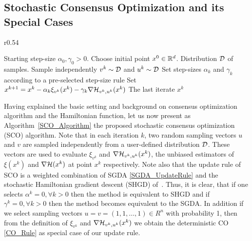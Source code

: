 \documentclass{article}
\begin{document}
\subsection{Stochastic Consensus Optimization and its Special Cases}
\begin{wrapfigure}{r}{0.54\textwidth}
\begin{minipage}{0.54\textwidth}
\vspace{-5ex}
\begin{algorithm}[H]%
   \caption{Stochastic Consensus Opt. (SCO)}
   \label{SCO_Algorithm}
\begin{algorithmic}
    Starting step-size $\alpha_0, \gamma_0>0$. Choose initial point $x^0 \in \mathbb{R}^d$. Distribution ${\cal D}$ of samples.\hspace{-10mm}   
   \STATE Sample independently $v^k \sim {\cal D}$ and $u^k \sim {\cal D}$
   \STATE Set step-sizes $\alpha_k$ and $\gamma_k$ according to a pre-selected step-size rule
   \STATE Set  $x^{k+1}=x^k - \alpha_k \xi_{v^k}(x^k) - \gamma_k \nabla {\cal H}_{v^k,u^k}(x^k)$
   \ENDFOR
    The last iterate $x^k$
\end{algorithmic}
\end{algorithm}
\end{minipage}
\vspace{-2ex}
\end{wrapfigure}
Having explained the basic setting and background on consensus optimization algorithm and the Hamiltonian function, let us now present as Algorithm~\ref{SCO_Algorithm} the proposed stochastic consensus optimization (SCO) algorithm. Note that in each iteration $k$, two random sampling vectors $u$ and $v$ are sampled independently from a user-defined distribution ${\cal D}$. These vectors are used to evaluate $\xi_{v^k}$ and $\nabla {\cal H}_{v^k,u^k}(x^k)$, the unbiased estimators of $\xi(x^k)$ and $\nabla {\cal H}(x^k)$ at point $x^k$ respectively. 
Note also that the update rule of SCO is a weighted combination of SGDA \eqref{SGDA_UpdateRule} and the stochastic Hamiltonian gradient descent (SHGD) of~\citet{loizou2020stochastic}. Thus, it is clear, that if one selects $\alpha^k=0, \forall k >0 $ then the method is equivalent to SHGD and if $ \gamma^k=0, \forall k >0 $ then the method becomes equivalent to the SGDA.
In addition if we select sampling vectors $u=v = (1,1, \dots, 1) \in R^n$ with probability 1, then from the definition of $\xi_{v^k}$ and $\nabla {\cal H}_{v^k,u^k}(x^k)$ we obtain the deterministic CO \eqref{CO_Rule} as special case of our update rule.
\end{document}
